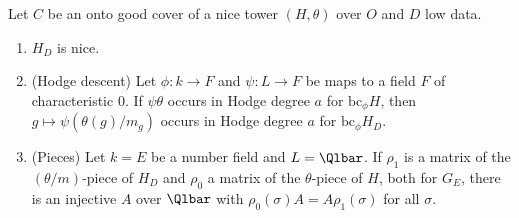 \begin{lemma}\label{pf:steps1:low}
Let $C$ be an onto good cover of a nice tower $(H,\theta)$ over $O$ and $D$ low data.
\begin{enumerate}[label=\textup{(\roman*)},nosep]
\item $H_D$ is nice.
\item \textup{(Hodge descent)} Let $\phi\colon k\to F$ and $\psi\colon L\to F$ be maps to a field $F$ of characteristic $0$.
  If $\psi\theta$ occurs in Hodge degree $a$ for $\mathrm{bc}_\phi H$, then $g\mapsto\psi(\theta(g)/m_g)$ occurs in Hodge degree $a$
  for $\mathrm{bc}_\phi H_D$.
\item \textup{(Pieces)} Let $k=E$ be a number field and $L=\Qlbar$. If $\rho_1$ is a matrix of the $(\theta/m)$-piece of $H_D$
  and $\rho_0$ a matrix of the $\theta$-piece of $H$, both for $G_E$, there is an injective $A$ over $\Qlbar$ with
  $\rho_0(\sigma)A=A\rho_1(\sigma)$ for all $\sigma$.
\end{enumerate}
 
 
\end{lemma}

